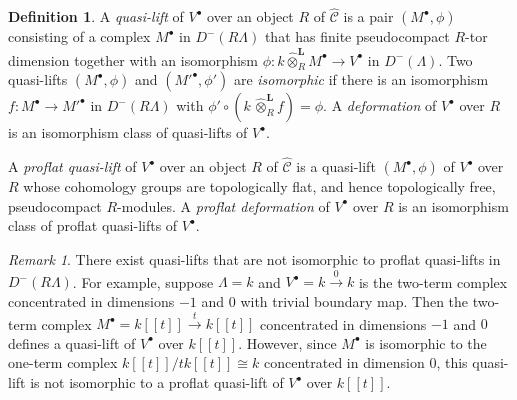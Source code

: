 \documentclass{amsart}
\theoremstyle{plain}
\theoremstyle{definition}
\newtheorem{dfn}[thm]{Definition}
\theoremstyle{remark}
\newtheorem{rem}[thm]{Remark}
\begin{document}
\begin{dfn}
\label{def:lifts} 
A \emph{quasi-lift}
of $V^\bullet$ over an object $R$ of
$\hat{\mathcal{C}}$ is a pair $(M^\bullet,\phi)$ consisting of a complex
$M^\bullet$ in
$D^-(R\Lambda)$ that has finite pseudocompact $R$-tor  dimension
together with an isomorphism
\hbox{$\phi: k \hat{\otimes}^{\mathbf{L}}_R M^\bullet \to V^\bullet$} in $D^-(\Lambda)$.
Two
quasi-lifts $(M^\bullet, \phi)$ and $({M'}^\bullet,\phi')$ are
\emph{isomorphic} if there is an isomorphism
$f:M^\bullet \to {M'}^\bullet$ in $D^-(R\Lambda)$ with
$\phi'\circ(k\,\hat{\otimes}_R^{\mathbf{L}} f)=\phi$.
A \emph{deformation}
of $V^\bullet$ over $R$ is an isomorphism class of quasi-lifts of $V^\bullet$.

A \emph{proflat quasi-lift} of $V^\bullet$ over an object $R$ of $\hat{\mathcal{C}}$
is a quasi-lift $(M^\bullet,\phi)$ of $V^\bullet$ over $R$ whose cohomology
groups are topologically flat, and hence topologically free, pseudocompact $R$-modules.
A \emph{proflat deformation} of $V^\bullet$ over $R$ is an isomorphism class
of proflat quasi-lifts of $V^\bullet$.
\end{dfn}

\begin{rem}
\label{rem:difference}
There exist quasi-lifts that are not isomorphic to proflat quasi-lifts in $D^-(R\Lambda)$.
For example, suppose $\Lambda=k$
and $V^\bullet = k \xrightarrow{0} k$ is the two-term complex concentrated in dimensions
$-1$ and $0$ with trivial boundary map.  Then the two-term complex
$M^\bullet = k[[t]] \xrightarrow{t} k[[t]]$ concentrated in dimensions $-1$ and $0$
defines a quasi-lift of $V^\bullet$ over $k[[t]]$. However,  since $M^\bullet$ is isomorphic to
the one-term complex $k[[t]]/tk[[t]]\cong k$ concentrated in dimension $0$,
this quasi-lift is not isomorphic to a  proflat quasi-lift of $V^\bullet$ over $k[[t]]$.
\end{rem}
\end{document}
